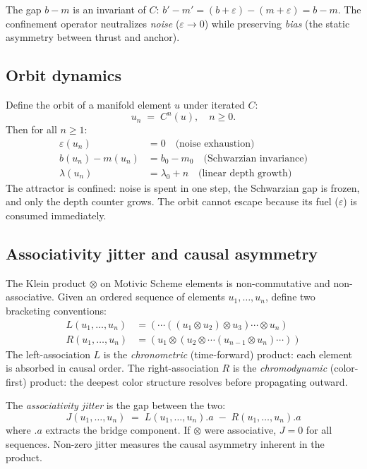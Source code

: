\begin{proposition}
\label{prop:schwarzian}
The gap $b - m$ is an invariant of $C$:
$b' - m' = (b + \varepsilon) - (m + \varepsilon) = b - m$.
The confinement operator neutralizes \emph{noise}
($\varepsilon \to 0$) while preserving \emph{bias}
(the static asymmetry between thrust and anchor).
\end{proposition}

\subsection{Orbit dynamics}

Define the orbit of a manifold element $u$ under iterated $C$:
\[
u_n \;=\; C^n(u), \quad n \geq 0.
\]
Then for all $n \geq 1$:
\begin{align}
\varepsilon(u_n) &= 0 \quad \text{(noise exhaustion)} \\
b(u_n) - m(u_n) &= b_0 - m_0 \quad \text{(Schwarzian invariance)} \\
\lambda(u_n) &= \lambda_0 + n \quad \text{(linear depth growth)}
\end{align}
The attractor is confined: noise is spent in one step,
the Schwarzian gap is frozen, and only the depth counter
grows. The orbit cannot escape because its fuel ($\varepsilon$)
is consumed immediately.

\subsection{Associativity jitter and causal asymmetry}

The Klein product $\otimes$ on Motivic Scheme elements is
non-commutative and non-associative. Given an ordered sequence
of elements $u_1, \ldots, u_n$, define two bracketing conventions:
\begin{align}
L(u_1, \ldots, u_n) &= (\cdots((u_1 \otimes u_2) \otimes u_3) \cdots \otimes u_n) \\
R(u_1, \ldots, u_n) &= (u_1 \otimes (u_2 \otimes \cdots (u_{n-1} \otimes u_n) \cdots))
\end{align}
The left-association $L$ is the \emph{chronometric} (time-forward)
product: each element is absorbed in causal order. The
right-association $R$ is the \emph{chromodynamic} (color-first)
product: the deepest color structure resolves before propagating
outward.

The \emph{associativity jitter} is the gap between the two:
\[
J(u_1, \ldots, u_n) \;=\; L(u_1, \ldots, u_n).a \;-\; R(u_1, \ldots, u_n).a
\]
where $.a$ extracts the bridge component. If $\otimes$ were
associative, $J = 0$ for all sequences. Non-zero jitter
measures the causal asymmetry inherent in the product.

